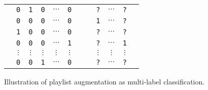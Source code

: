 \begin{figure}[!h]
\centering
{}  %
\setlength{\tabcolsep}{1pt} %
\begin{tabular}{|*{7}{c}|aaaaa|} \hline
\rule{0em}{10pt}
& \texttt{0} & \texttt{1} & \texttt{0} & $\cdots$ & \texttt{0} & & & \texttt{?} & $\cdots$ & \texttt{?} & \\
& \texttt{0} & \texttt{0} & \texttt{0} & $\cdots$ & \texttt{0} & & & \texttt{1} & $\cdots$ & \texttt{?} & \\
& \texttt{1} & \texttt{0} & \texttt{0} & $\cdots$ & \texttt{0} & & & \texttt{?} & $\cdots$ & \texttt{?} & \\
\vspace{-3pt}
& \texttt{0} & \texttt{0} & \texttt{0} & $\cdots$ & \texttt{1} & & & \texttt{?} & $\cdots$ & \texttt{1} & \\
& $\vdots$ & $\vdots$ & $\vdots$ & $\vdots$ & $\vdots$ & & & $\vdots$ & $\vdots$ & $\vdots$ & \\
& \texttt{0} & \texttt{0} & \texttt{1} & $\cdots$ & \texttt{0} & & & \texttt{?} & $\cdots$ & \texttt{?} & \\ \hline
\end{tabular}
\caption{Illustration of playlist augmentation as multi-label classification.}
\label{fig:pla}
\end{figure}
